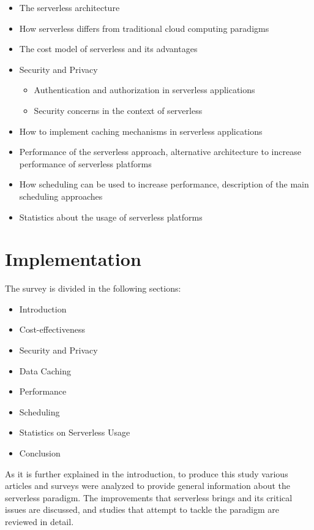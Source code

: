 \documentclass{scrartcl}
\begin{document}
\begin{itemize}
  \item The serverless architecture
  \item How serverless differs from traditional cloud computing paradigms
  \item The cost model of serverless and its advantages
  \item Security and Privacy
  \begin{itemize}
    \item Authentication and authorization in serverless applications
    \item Security concerns in the context of serverless
  \end{itemize}
  \item How to implement caching mechanisms in serverless applications
  \item Performance of the serverless approach, alternative architecture to increase performance of serverless platforms
  \item How scheduling can be used to increase performance, description of the main scheduling approaches
  \item Statistics about the usage of serverless platforms
\end{itemize}

\newpage
\section{Implementation}
The survey is divided in the following sections:

\begin{itemize}
  \item Introduction
  \item Cost-effectiveness 
  \item Security and Privacy 
  \item Data Caching 
  \item Performance 
  \item Scheduling 
  \item Statistics on Serverless Usage 
  \item Conclusion
\end{itemize}

As it is further explained in the introduction, to produce this study various articles and surveys were analyzed to provide general information about the serverless paradigm. The improvements that serverless brings and its critical issues are discussed, and studies that attempt to tackle the paradigm are reviewed in detail.
\end{document}

